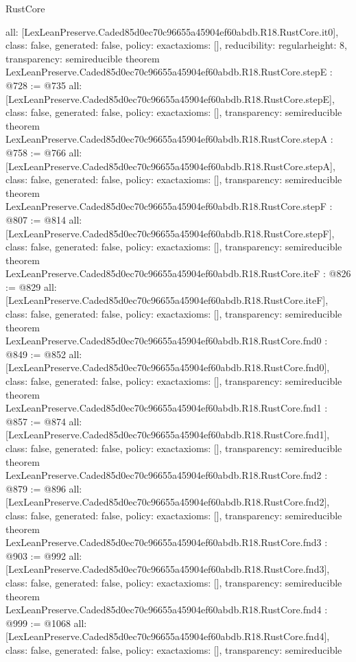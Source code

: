 \begin{lexlean}{RustCore}
\begin{coremodule}
{  all: [LexLeanPreserve.Caded85d0ec70c96655a45904ef60abdb.R18.RustCore.it0],
  class: false,
  generated: false,
  policy: exact{axioms: []},
  reducibility: regular{height: 8},
  transparency: semireducible
}
theorem LexLeanPreserve.Caded85d0ec70c96655a45904ef60abdb.R18.RustCore.stepE : @728 := @735 {
  all: [LexLeanPreserve.Caded85d0ec70c96655a45904ef60abdb.R18.RustCore.stepE],
  class: false,
  generated: false,
  policy: exact{axioms: []},
  transparency: semireducible
}
theorem LexLeanPreserve.Caded85d0ec70c96655a45904ef60abdb.R18.RustCore.stepA : @758 := @766 {
  all: [LexLeanPreserve.Caded85d0ec70c96655a45904ef60abdb.R18.RustCore.stepA],
  class: false,
  generated: false,
  policy: exact{axioms: []},
  transparency: semireducible
}
theorem LexLeanPreserve.Caded85d0ec70c96655a45904ef60abdb.R18.RustCore.stepF : @807 := @814 {
  all: [LexLeanPreserve.Caded85d0ec70c96655a45904ef60abdb.R18.RustCore.stepF],
  class: false,
  generated: false,
  policy: exact{axioms: []},
  transparency: semireducible
}
theorem LexLeanPreserve.Caded85d0ec70c96655a45904ef60abdb.R18.RustCore.iteF : @826 := @829 {
  all: [LexLeanPreserve.Caded85d0ec70c96655a45904ef60abdb.R18.RustCore.iteF],
  class: false,
  generated: false,
  policy: exact{axioms: []},
  transparency: semireducible
}
theorem LexLeanPreserve.Caded85d0ec70c96655a45904ef60abdb.R18.RustCore.fnd0 : @849 := @852 {
  all: [LexLeanPreserve.Caded85d0ec70c96655a45904ef60abdb.R18.RustCore.fnd0],
  class: false,
  generated: false,
  policy: exact{axioms: []},
  transparency: semireducible
}
theorem LexLeanPreserve.Caded85d0ec70c96655a45904ef60abdb.R18.RustCore.fnd1 : @857 := @874 {
  all: [LexLeanPreserve.Caded85d0ec70c96655a45904ef60abdb.R18.RustCore.fnd1],
  class: false,
  generated: false,
  policy: exact{axioms: []},
  transparency: semireducible
}
theorem LexLeanPreserve.Caded85d0ec70c96655a45904ef60abdb.R18.RustCore.fnd2 : @879 := @896 {
  all: [LexLeanPreserve.Caded85d0ec70c96655a45904ef60abdb.R18.RustCore.fnd2],
  class: false,
  generated: false,
  policy: exact{axioms: []},
  transparency: semireducible
}
theorem LexLeanPreserve.Caded85d0ec70c96655a45904ef60abdb.R18.RustCore.fnd3 : @903 := @992 {
  all: [LexLeanPreserve.Caded85d0ec70c96655a45904ef60abdb.R18.RustCore.fnd3],
  class: false,
  generated: false,
  policy: exact{axioms: []},
  transparency: semireducible
}
theorem LexLeanPreserve.Caded85d0ec70c96655a45904ef60abdb.R18.RustCore.fnd4 : @999 := @1068 {
  all: [LexLeanPreserve.Caded85d0ec70c96655a45904ef60abdb.R18.RustCore.fnd4],
  class: false,
  generated: false,
  policy: exact{axioms: []},
  transparency: semireducible
}
\end{coremodule}
\end{lexlean}
